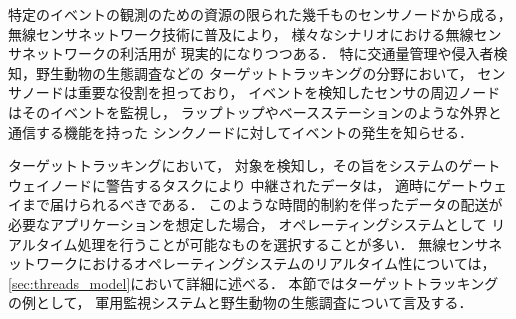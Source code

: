 特定のイベントの観測のための資源の限られた幾千ものセンサノードから成る，
無線センサネットワーク技術に普及により，
様々なシナリオにおける無線センサネットワークの利活用が
現実的になりつつある．
特に交通量管理や侵入者検知，野生動物の生態調査などの
ターゲットトラッキングの分野において，
センサノードは重要な役割を担っており，
イベントを検知したセンサの周辺ノードはそのイベントを監視し，
ラップトップやベースステーションのような外界と通信する機能を持った
シンクノードに対してイベントの発生を知らせる．

ターゲットトラッキングにおいて，
対象を検知し，その旨をシステムのゲートウェイノードに警告するタスクにより
中継されたデータは，
適時にゲートウェイまで届けられるべきである．
このような時間的制約を伴ったデータの配送が必要なアプリケーションを想定した場合，
オペレーティングシステムとして
リアルタイム処理を行うことが可能なものを選択することが多い．
無線センサネットワークにおけるオペレーティングシステムのリアルタイム性については，
\ref{sec:threads_model}において詳細に述べる．
本節ではターゲットトラッキングの例として，
軍用監視システムと野生動物の生態調査について言及する．




